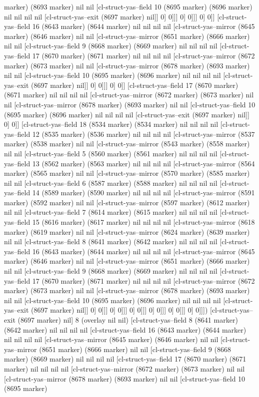 {{marker) (8693 marker) nil nil [cl-struct-yas--field 10 (8695 marker) (8696 marker) nil nil nil nil [cl-struct-yas--exit (8697 marker) nil]] 0] 0]]] 0] 0]]] 0] 0]] [cl-struct-yas--field 16 (8643 marker) (8644 marker) nil nil nil nil [cl-struct-yas--mirror (8645 marker) (8646 marker) nil nil [cl-struct-yas--mirror (8651 marker) (8666 marker) nil nil [cl-struct-yas--field 9 (8668 marker) (8669 marker) nil nil nil nil [cl-struct-yas--field 17 (8670 marker) (8671 marker) nil nil nil nil [cl-struct-yas--mirror (8672 marker) (8673 marker) nil nil [cl-struct-yas--mirror (8678 marker) (8693 marker) nil nil [cl-struct-yas--field 10 (8695 marker) (8696 marker) nil nil nil nil [cl-struct-yas--exit (8697 marker) nil]] 0] 0]]] 0] 0]] [cl-struct-yas--field 17 (8670 marker) (8671 marker) nil nil nil nil [cl-struct-yas--mirror (8672 marker) (8673 marker) nil nil [cl-struct-yas--mirror (8678 marker) (8693 marker) nil nil [cl-struct-yas--field 10 (8695 marker) (8696 marker) nil nil nil nil [cl-struct-yas--exit (8697 marker) nil]] 0] 0]] [cl-struct-yas--field 18 (8534 marker) (8534 marker) nil nil nil nil [cl-struct-yas--field 12 (8535 marker) (8536 marker) nil nil nil nil [cl-struct-yas--mirror (8537 marker) (8538 marker) nil nil [cl-struct-yas--mirror (8543 marker) (8558 marker) nil nil [cl-struct-yas--field 5 (8560 marker) (8561 marker) nil nil nil nil [cl-struct-yas--field 13 (8562 marker) (8563 marker) nil nil nil nil [cl-struct-yas--mirror (8564 marker) (8565 marker) nil nil [cl-struct-yas--mirror (8570 marker) (8585 marker) nil nil [cl-struct-yas--field 6 (8587 marker) (8588 marker) nil nil nil nil [cl-struct-yas--field 14 (8589 marker) (8590 marker) nil nil nil nil [cl-struct-yas--mirror (8591 marker) (8592 marker) nil nil [cl-struct-yas--mirror (8597 marker) (8612 marker) nil nil [cl-struct-yas--field 7 (8614 marker) (8615 marker) nil nil nil nil [cl-struct-yas--field 15 (8616 marker) (8617 marker) nil nil nil nil [cl-struct-yas--mirror (8618 marker) (8619 marker) nil nil [cl-struct-yas--mirror (8624 marker) (8639 marker) nil nil [cl-struct-yas--field 8 (8641 marker) (8642 marker) nil nil nil nil [cl-struct-yas--field 16 (8643 marker) (8644 marker) nil nil nil nil [cl-struct-yas--mirror (8645 marker) (8646 marker) nil nil [cl-struct-yas--mirror (8651 marker) (8666 marker) nil nil [cl-struct-yas--field 9 (8668 marker) (8669 marker) nil nil nil nil [cl-struct-yas--field 17 (8670 marker) (8671 marker) nil nil nil nil [cl-struct-yas--mirror (8672 marker) (8673 marker) nil nil [cl-struct-yas--mirror (8678 marker) (8693 marker) nil nil [cl-struct-yas--field 10 (8695 marker) (8696 marker) nil nil nil nil [cl-struct-yas--exit (8697 marker) nil]] 0] 0]]] 0] 0]]] 0] 0]]] 0] 0]]] 0] 0]]] 0] 0]]]) [cl-struct-yas--exit (8697 marker) nil] 8 (overlay nil nil) [cl-struct-yas--field 8 (8641 marker) (8642 marker) nil nil nil nil [cl-struct-yas--field 16 (8643 marker) (8644 marker) nil nil nil nil [cl-struct-yas--mirror (8645 marker) (8646 marker) nil nil [cl-struct-yas--mirror (8651 marker) (8666 marker) nil nil [cl-struct-yas--field 9 (8668 marker) (8669 marker) nil nil nil nil [cl-struct-yas--field 17 (8670 marker) (8671 marker) nil nil nil nil [cl-struct-yas--mirror (8672 marker) (8673 marker) nil nil [cl-struct-yas--mirror (8678 marker) (8693 marker) nil nil [cl-struct-yas--field 10 (8695 marker) }}
